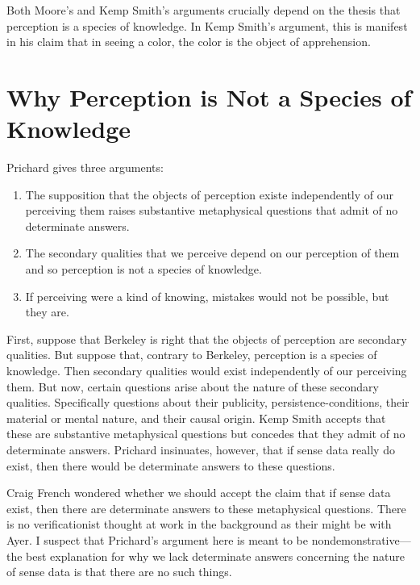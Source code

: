 \documentclass[11pt]{article}
\begin{document}
Both Moore's and Kemp Smith's arguments crucially depend on the thesis that perception is a species of knowledge. In Kemp Smith's argument, this is manifest in his claim that in seeing a color, the color is the object of apprehension.

\section{Why Perception is Not a Species of Knowledge} %
\label{sec:why_perception_is_not_a_species_of_knowledge}
Prichard gives three arguments:
\begin{enumerate}
    \item The supposition that the objects of perception existe independently of our perceiving them raises substantive metaphysical questions that admit of no determinate answers.
    \item The secondary qualities that we perceive depend on our perception of them and so perception is not a species of knowledge.
    \item If perceiving were a kind of knowing, mistakes would not be possible, but they are.
\end{enumerate}

First, suppose that Berkeley is right that the objects of perception are secondary qualities. But suppose that, contrary to Berkeley, perception is a species of knowledge. Then secondary qualities would exist independently of our perceiving them. But now, certain questions arise about the nature of these secondary qualities. Specifically questions about their publicity, persistence-conditions, their material or mental nature, and their causal origin. Kemp Smith accepts that these are substantive metaphysical questions but concedes that they admit of no determinate answers. Prichard insinuates, however, that if sense data really do exist, then there would be determinate answers to these questions.
    
\begin{discussion}
    Craig French wondered whether we should accept the claim that if sense data exist, then there are determinate answers to these metaphysical questions. There is no verificationist thought at work in the background as their might be with Ayer. I suspect that Prichard's argument here is meant to be nondemonstrative---the best explanation for why we lack determinate answers concerning the nature of sense data is that there are no such things.
\end{discussion}
\end{document}
